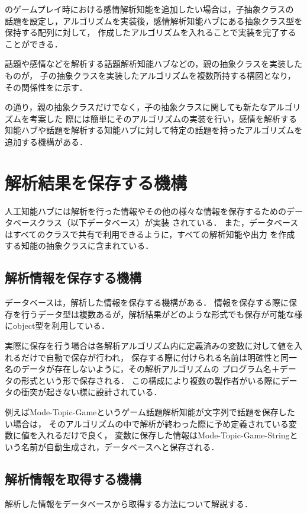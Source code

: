 のゲームプレイ時における感情解析知能を追加したい場合は，子抽象クラスの
話題を設定し，アルゴリズムを実装後，感情解析知能ハブにある抽象クラス型を保持する配列に対して，
作成したアルゴリズムを入れることで実装を完了することができる．

話題や感情などを解析する話題解析知能ハブなどの，親の抽象クラスを実装したものが，
子の抽象クラスを実装したアルゴリズムを複数所持する構図となり，その関係性をに示す．


の通り，親の抽象クラスだけでなく，子の抽象クラスに関しても新たなアルゴリズムを考案した
際には簡単にそのアルゴリズムの実装を行い，感情を解析する
知能ハブや話題を解析する知能ハブに対して特定の話題を持ったアルゴリズムを追加する機構がある．


\section{解析結果を保存する機構}
人工知能ハブには解析を行った情報やその他の様々な情報を保存するためのデータベースクラス（以下データベース）が実装
されている．
また，データベースはすべてのクラスで共有で利用できるように，すべての解析知能や出力
を作成する知能の抽象クラスに含まれている．

\subsection{解析情報を保存する機構}
データベースは，解析した情報を保存する機構がある．
情報を保存する際に保存を行うデータ型は複数あるが，解析結果がどのような形式でも保存が可能な様にobject型を利用している．

実際に保存を行う場合は各解析アルゴリズム内に定義済みの変数に対して値を入れるだけで自動で保存が行われ，
保存する際に付けられる名前は明確性と同一名のデータが存在しないように，その解析アルゴリズムの
プログラム名＋データの形式という形で保存される．
この構成により複数の製作者がいる際にデータの衝突が起きない様に設計されている．

例えばMode-Topic-Gameというゲーム話題解析知能が文字列で話題を保存したい場合は，
そのアルゴリズムの中で解析が終わった際に予め定義されている変数に値を入れるだけで良く，
変数に保存した情報はMode-Topic-Game-Stringという名前が自動生成され，データベースへと保存される．

\subsection{解析情報を取得する機構}
解析した情報をデータベースから取得する方法について解説する．

